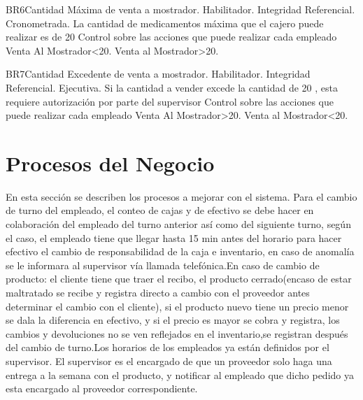 \begin{BussinesRule}{BR6}{Cantidad Máxima de venta a mostrador.}
	\BRitem[Tipo:] Habilitador. 
	\BRitem[Clase:] Integridad Referencial. 
	\BRitem[Nivel:] Cronometrada. %
	\BRitem[Descripción:] La cantidad de medicamentos máxima que el cajero puede realizar es de 20
	\BRitem[Motivación:]  Control sobre las acciones que puede realizar cada empleado
	   Venta Al Mostrador<20.
	 Venta al Mostrador>20.
\end{BussinesRule}
\begin{BussinesRule}{BR7}{Cantidad Excedente de venta a mostrador.}
	\BRitem[Tipo:] Habilitador. 
	\BRitem[Clase:] Integridad Referencial. 
	\BRitem[Nivel:] Ejecutiva. %
	\BRitem[Descripción:] Si la cantidad a vender excede la cantidad de 20 , esta requiere autorización por parte del supervisor
	\BRitem[Motivación:]  Control sobre las acciones que puede realizar cada empleado
	   Venta Al Mostrador>20.
	 Venta al Mostrador<20.
\end{BussinesRule}
\newpage



\section{Procesos del Negocio}
En esta sección se describen los procesos a mejorar con el sistema.
Para el cambio de turno del empleado, el conteo de cajas y de efectivo se debe hacer en colaboración del empleado del turno anterior así como del siguiente turno, según el caso, el empleado tiene que llegar hasta 15 min antes del horario para hacer efectivo el cambio de responsabilidad de la caja e inventario, en caso de anomalía se le informara al supervisor vía llamada telefónica.En caso de cambio de producto: el cliente tiene que traer el recibo, el producto cerrado(encaso de estar maltratado se recibe y registra directo a cambio con el proveedor antes determinar  el  cambio  con  el  cliente),  si  el  producto  nuevo  tiene  un  precio  menor  se  dala  la  diferencia  en  efectivo,  y  si  el  precio  es  mayor  se  cobra  y  registra,  los  cambios y devoluciones  no  se  ven  reflejados  en  el  inventario,se  registran  después  del  cambio  de turno.Los horarios de los empleados ya están definidos por el supervisor. El supervisor es el encargado de que un proveedor solo haga una entrega a la semana con el producto, y notificar al empleado que dicho pedido ya esta encargado al proveedor correspondiente.















